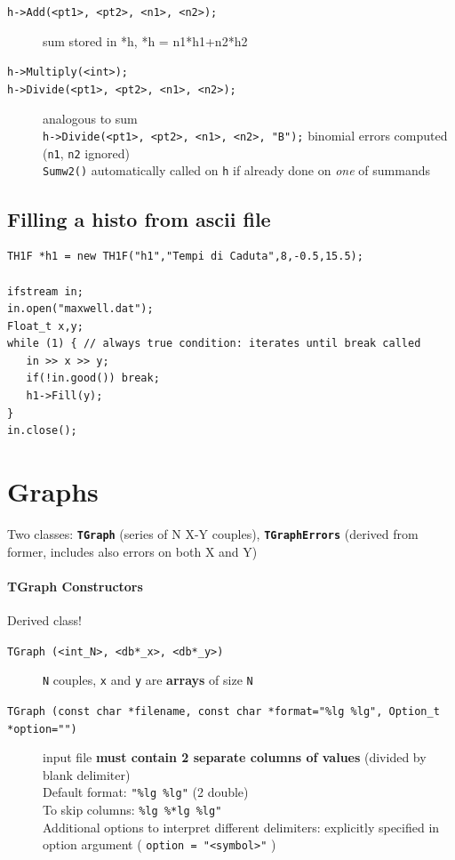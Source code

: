 \documentclass[10pt, twoside]{article}
\newcommand{\ttt}[1]{\colorbox{boxgray}{\texttt{#1}}}
\begin{document}
\begin{description}

\item[\ttt{h->Add(<pt1>, <pt2>, <n1>, <n2>);}] sum stored in *h, *h = n1*h1+n2*h2

\item[\ttt{h->Multiply(<int>);}]

\item[\ttt{h->Divide(<pt1>, <pt2>, <n1>, <n2>);}] analogous to sum \\ \noindent\ttt{h->Divide(<pt1>, <pt2>, <n1>, <n2>, "B");} binomial errors computed (\texttt{n1}, \texttt{n2} ignored)
\\\texttt{Sumw2()} automatically called on \texttt{h} if already done on \textit{one} of summands

\end{description}

\subsection{Filling a histo from ascii file}
\begin{verbatim}
TH1F *h1 = new TH1F("h1","Tempi di Caduta",8,-0.5,15.5); 

ifstream in;
in.open("maxwell.dat");
Float_t x,y;
while (1) { // always true condition: iterates until break called
   in >> x >> y;
   if(!in.good()) break;
   h1->Fill(y);
}
in.close();
\end{verbatim}

\section{Graphs}
Two classes: \textbf{\ttt{TGraph}} (series of N X-Y couples), \textbf{\ttt{TGraphErrors}} (derived from former, includes also errors on both X and Y)

\paragraph{TGraph Constructors} Derived class!
\begin{description}
\item[\ttt{TGraph (<int\_N>, <db*\_x>, <db*\_y>)}] \texttt{N} couples, \ttt{x} and \ttt{y} are \textbf{arrays} of size \texttt{N}
\item[\ttt{TGraph (const char *filename, const char *format="\%lg \%lg", 
Option\_t *option="")}] input file \textbf{must contain 2 separate columns of values} (divided by blank delimiter) 
\\Default format: \ttt{"\%lg \%lg"} (2 double)\\
To skip columns: \ttt{\%lg \%*lg \%lg"}
\\Additional options to interpret different delimiters: explicitly specified in option argument ( \ttt{option = "<symbol>"} )
\end{description}
\end{document}
